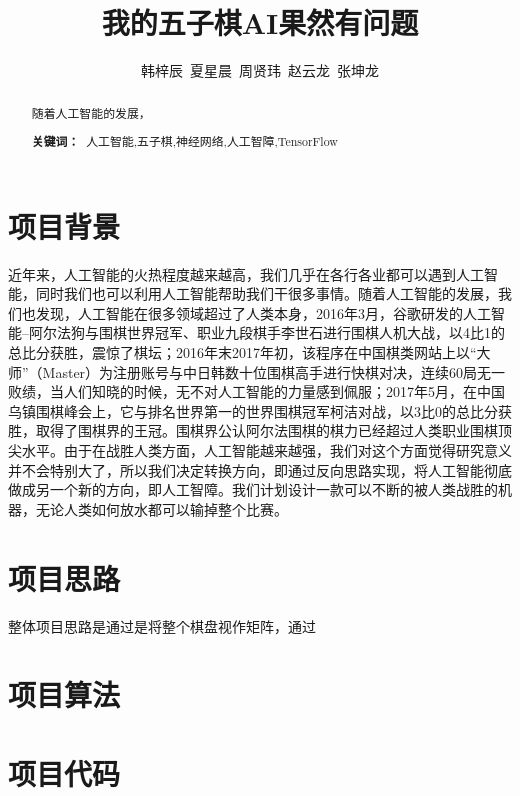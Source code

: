 \documentclass[a4paper]{article}
\title{\heiti \Large 我的五子棋AI果然有问题}%
\author{\songti \small 韩梓辰\ 夏星晨\ 周贤玮\ 赵云龙\ 张坤龙}%
\renewcommand{\headrulewidth}{0.4pt}
\begin{document}
\maketitle%
\thispagestyle{fancy}%
\lhead{\textcolor{gray} {计算机科学}}
\rhead{\textcolor{gray} {DOI:xxxxxx}}
\renewcommand{\headrulewidth}{0.4pt}
\begin{abstract}
    随着人工智能的发展，
    \par\textbf{关键词：\ }人工智能,五子棋,神经网络,人工智障,TensorFlow
\end{abstract}
\tableofcontents  %
\newpage
    \begin{multicols}{2}
    \section{项目背景}
    近年来，人工智能的火热程度越来越高，我们几乎在各行各业都可以遇到人工智能，同时我们也可以利用人工智能帮助我们干很多事情。随着人工智能的发展，我们也发现，人工智能在很多领域超过了人类本身，2016年3月，谷歌研发的人工智能--阿尔法狗与围棋世界冠军、职业九段棋手李世石进行围棋人机大战，以4比1的总比分获胜，震惊了棋坛；2016年末2017年初，该程序在中国棋类网站上以“大师”（Master）为注册账号与中日韩数十位围棋高手进行快棋对决，连续60局无一败绩，当人们知晓的时候，无不对人工智能的力量感到佩服；2017年5月，在中国乌镇围棋峰会上，它与排名世界第一的世界围棋冠军柯洁对战，以3比0的总比分获胜，取得了围棋界的王冠。围棋界公认阿尔法围棋的棋力已经超过人类职业围棋顶尖水平。由于在战胜人类方面，人工智能越来越强，我们对这个方面觉得研究意义并不会特别大了，所以我们决定转换方向，即通过反向思路实现，将人工智能彻底做成另一个新的方向，即人工智障。我们计划设计一款可以不断的被人类战胜的机器，无论人类如何放水都可以输掉整个比赛。
    \section{项目思路}
    整体项目思路是通过是将整个棋盘视作矩阵，通过
    \section{项目算法}

    \section{项目代码}
    \newpage
    \begin{thebibliography}{30}%
    \end{thebibliography}
    \newpage
\end{multicols}
\end{document}
